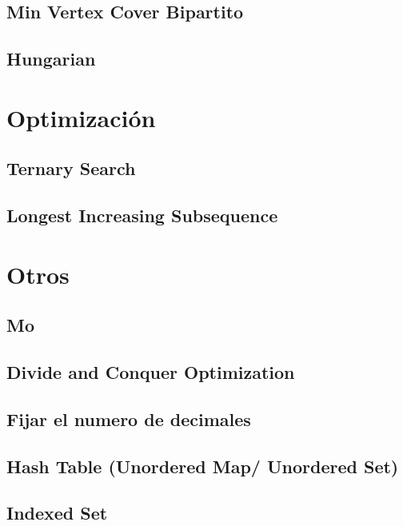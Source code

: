 \documentclass[a4paper,11pt,landscape,twocolumn]{article}
\begin{document}
\subsection{Min Vertex Cover Bipartito}

\subsection{Hungarian}


\section{Optimización} %
\subsection{Ternary Search}

\subsection{Longest Increasing Subsequence}


\section{Otros} %
\subsection{Mo}

\subsection{Divide and Conquer Optimization}

\subsection{Fijar el numero de decimales}

\subsection{Hash Table (Unordered Map/ Unordered Set)}

\subsection{Indexed Set}

\end{document}
